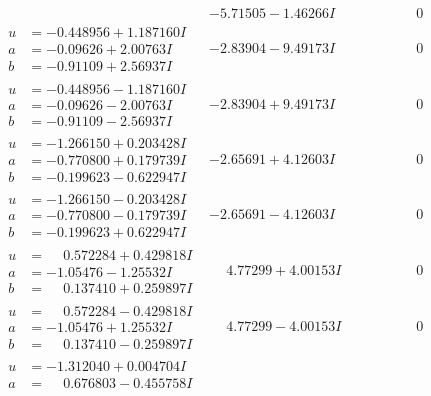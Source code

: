 \documentclass[1p]{elsarticle_modified}
\theoremstyle{definition}
\begin{document}
$$\begin{array}{c|c|c}
 & -5.71505 - 1.46266 I & \phantom{-0.000000 } 0 \\ \hline\begin{aligned}
u &= -0.448956 + 1.187160 I \\
a &= -0.09626 + 2.00763 I \\
b &= -0.91109 + 2.56937 I\end{aligned}
 & -2.83904 - 9.49173 I & \phantom{-0.000000 } 0 \\ \hline\begin{aligned}
u &= -0.448956 - 1.187160 I \\
a &= -0.09626 - 2.00763 I \\
b &= -0.91109 - 2.56937 I\end{aligned}
 & -2.83904 + 9.49173 I & \phantom{-0.000000 } 0 \\ \hline\begin{aligned}
u &= -1.266150 + 0.203428 I \\
a &= -0.770800 + 0.179739 I \\
b &= -0.199623 - 0.622947 I\end{aligned}
 & -2.65691 + 4.12603 I & \phantom{-0.000000 } 0 \\ \hline\begin{aligned}
u &= -1.266150 - 0.203428 I \\
a &= -0.770800 - 0.179739 I \\
b &= -0.199623 + 0.622947 I\end{aligned}
 & -2.65691 - 4.12603 I & \phantom{-0.000000 } 0 \\ \hline\begin{aligned}
u &= \phantom{-}0.572284 + 0.429818 I \\
a &= -1.05476 - 1.25532 I \\
b &= \phantom{-}0.137410 + 0.259897 I\end{aligned}
 & \phantom{-}4.77299 + 4.00153 I & \phantom{-0.000000 } 0 \\ \hline\begin{aligned}
u &= \phantom{-}0.572284 - 0.429818 I \\
a &= -1.05476 + 1.25532 I \\
b &= \phantom{-}0.137410 - 0.259897 I\end{aligned}
 & \phantom{-}4.77299 - 4.00153 I & \phantom{-0.000000 } 0 \\ \hline\begin{aligned}
u &= -1.312040 + 0.004704 I \\
a &= \phantom{-}0.676803 - 0.455758 I \\

\end{aligned}
\end{array}$$
\end{document}
